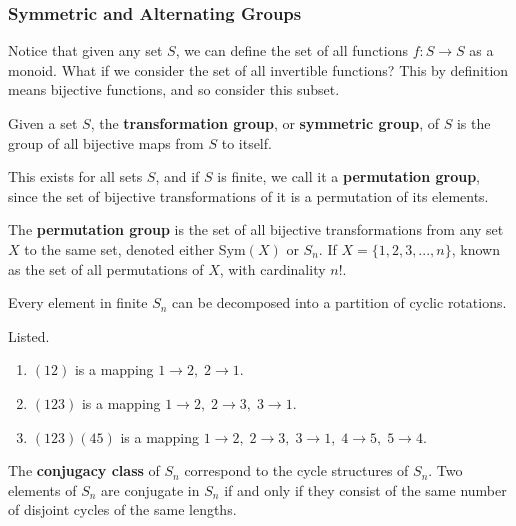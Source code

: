 \subsubsection{Symmetric and Alternating Groups}

  Notice that given any set $S$, we can define the set of all functions $f: S \rightarrow S$ as a monoid. What if we consider the set of all invertible functions? This by definition means bijective functions, and so consider this subset.  

  \begin{definition}
    Given a set $S$, the \textbf{transformation group}, or \textbf{symmetric group}, of $S$ is the group of all bijective maps from $S$ to itself. 
  \end{definition} 

  This exists for all sets $S$, and if $S$ is finite, we call it a \textbf{permutation group}, since the set of bijective transformations of it is a permutation of its elements. 

  \begin{definition}
    The \textbf{permutation group} is the set of all bijective transformations from any set $X$ to the same set, denoted either Sym$(X)$ or $S_n$. If $X = \{1, 2, 3 ,... , n\}$, known as the set of all permutations of $X$, with cardinality $n!$. 
  \end{definition}

  \begin{lemma}
    Every element in finite $S_{n}$ can be decomposed into a partition of cyclic rotations.
  \end{lemma}

  \begin{example}
    Listed.
    \begin{enumerate}
      \item $(1 2)$ is a mapping $1 \rightarrow 2,\; 2 \rightarrow 1$. 
      \item $(1 2 3)$ is a mapping $1\rightarrow 2,\; 2 \rightarrow 3,\; 3 \rightarrow 1$. 
      \item $(1 2 3) (4 5)$ is a mapping $1\rightarrow 2,\; 2 \rightarrow 3,\; 3 \rightarrow 1, \;4 \rightarrow 5, \;5 \rightarrow 4$. 
    \end{enumerate}
  \end{example}

  \begin{definition}
    The \textbf{conjugacy class} of $S_{n}$ correspond to the cycle structures of $S_{n}$. Two elements of $S_{n}$ are conjugate in $S_{n}$ if and only if they consist of the same number of disjoint cycles of the same lengths. 
  \end{definition}

